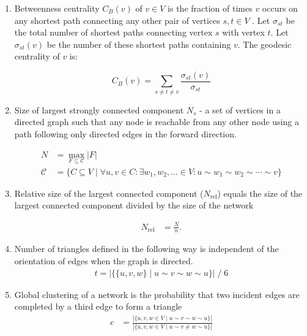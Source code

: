 \documentclass[preprint,12pt]{elsarticle}
\begin{document}
\begin{enumerate}
\item Betweenness
centrality $ C_B(v)$ of $v \in V$ is the fraction of times
$v$ occurs on any shortest path connecting any other pair of vertices $s, t \in V$ . Let $\sigma_{st}$ be the total number of shortest paths connecting vertex $s$ with vertex $t$. Let
$\sigma_{st}(v)$ be the number of these shortest paths containing $v$. The geodesic centrality of $v$ is:

\begin{equation}
    C_B(v) = \sum_{s \neq t \neq v} \frac{\sigma_{st}(v)}{\sigma_{st}}
\end{equation}


\item Size of largest strongly connected component $N_s$ - a set of vertices in a directed graph such that any node is reachable from any other node using a path following only directed edges in the forward direction.

\begin{align}
    N &= \max_{F \subseteq \mathcal C} |F|  \\
  \mathcal C &= \{ C \subseteq V \mid \forall u, v \in C:  \exists w_1,
  w_2, \ldots \in V:  u \sim w_1 \sim w_2 \sim \cdots \sim v \} \nonumber
\end{align}

\item Relative size of the largest connected component ($N_{\mathrm{rel}}$) equals the size of the largest connected component divided by the size of the network

\begin{align}
    N_{\mathrm{rel}} &= \frac N n. 
\end{align}

\item Number of triangles defined in the following way is independent of the orientation of edges when the graph is directed. 
\begin{align}
    t = | \{ \{u, v, w\} \mid u \sim v \sim w \sim u \} | \;/\; 6
\end{align}


\item Global clustering of a network is the probability that two incident edges are completed by a third edge to form a triangle
\begin{align}
   c &= \frac {|\{ u, v, w \in V \mid u \sim
    v \sim w \sim u \}|} {|\{ u, v, w \in V \mid u \sim v \neq w \sim u
    \}|} 
\end{align}

\end{enumerate}
\end{document}
